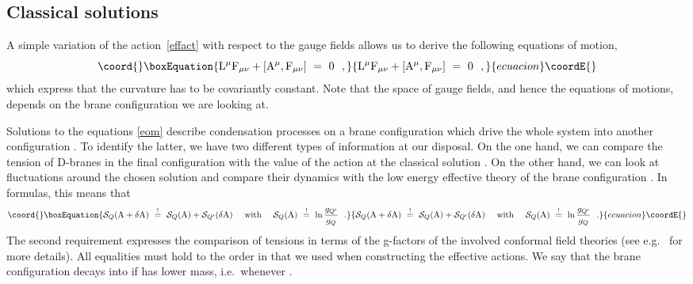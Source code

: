 \documentclass[12pt,a4paper]{article}
\def\cS{{\mathcal S}}
\def\tF{{\rm F}}
\def\tA{{\rm A}}
\def\tL{{\rm L}}
\begin{document}
\subsection{\label{sc:Solutions}Classical solutions}

A simple  variation of the action~\eqref{effact} with respect to 
the gauge fields allows us to derive the following equations of 
motion, 
\begin{equation}\coord{}\boxEquation{
\label{eom}
\tL^{\mu}\tF_{\mu\nu}+[\tA^{\mu},\tF_{\mu\nu}]\ =\ 0 \ \ ,
}{
\tL^{\mu}\tF_{\mu\nu}+[\tA^{\mu},\tF_{\mu\nu}]\ =\ 0 \ \ ,
}{ecuacion}\coordE{}\end{equation}
which express that the curvature has to be covariantly constant.
Note that the space of gauge fields, and hence the equations 
of motions, depends on the brane configuration we are looking at.
\smallskip 

Solutions to the equations \eqref{eom} describe condensation processes 
on a brane configuration \coordHE{} which drive the whole system into 
another configuration \coordHE{}. 
To identify the latter, we have two different types of information
at our disposal. On the one hand, we can compare the tension of 
D-branes in the final configuration \coordHE{} with the value of the 
action \myHighlight{$\cS_Q(\tA)$}\coordHE{}  at the classical solution \myHighlight{$\tA(g)$}\coordHE{}. On the other 
hand, we can look at fluctuations around the chosen solution and 
compare their dynamics with the low energy effective theory 
\myHighlight{$\cS_{Q^\prime}$}\coordHE{} of the brane configuration \coordHE{}. In formulas, 
this means that 
\begin{equation}\coord{}\boxEquation{\label{fluctuation}
\cS_{Q} (\tA+\delta \tA)\ \overset{!}{=}\  \cS_{Q} (\tA) + 
\cS_{Q^\prime} (\delta \tA) \ \ \ \text{ with } \ \ \
\cS_Q(\tA) \ \overset{!}{=} \ \ln \frac{g_{Q^\prime}}{g_Q} 
\ \ . 
}{\cS_{Q} (\tA+\delta \tA)\ \overset{!}{=}\  \cS_{Q} (\tA) + 
\cS_{Q^\prime} (\delta \tA) \ \ \ \text{ with } \ \ \
\cS_Q(\tA) \ \overset{!}{=} \ \ln \frac{g_{Q^\prime}}{g_Q} 
\ \ . 
}{ecuacion}\coordE{}\end{equation}
The second requirement expresses the comparison of tensions in 
terms of the g-factors of the involved  conformal field theories
(see e.g.\ \cite{Alekseev:2000fd} for more details). All equalities  
must hold to the order in \myHighlight{$(1/k)$}\coordHE{} that we used when constructing 
the effective actions. We say that the brane configuration \coordHE{} decays
into \myHighlight{$Q'$}\coordHE{} if \myHighlight{$Q'$}\coordHE{} has lower mass, i.e.\ whenever \coordHE{}. 
\end{document}
